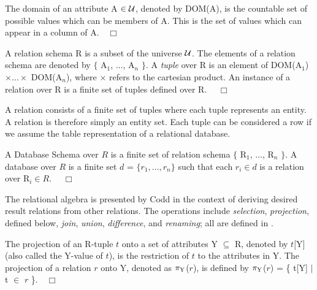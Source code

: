 \begin{definition}
\begin{rm}
The domain of an attribute A $\in \cal U$, denoted by DOM(A), is the
countable set
of possible values which can be members of A.  This is the set
of values which can appear in a column of A.$\quad\Box$
\end{rm}
\end{definition}
\begin{definition}
\begin{rm}
A relation schema R is a subset of the universe $\cal U$.  The elements
of a relation schema are denoted by $\{$ A$_1$, $\ldots$, A$_n$ $\}$.
A {\em tuple} over R is an element of DOM(A$_1$) $\times \ldots \times$
DOM(A$_n$), where $\times$ refers to the cartesian product.  An instance
of a relation over R is a finite set of tuples defined over R. $\quad\Box$
\end{rm}
\end{definition}

A relation consists of a finite set of tuples where each tuple
represents an entity.  A relation is therefore simply an entity set. 
Each tuple can be considered a row if we assume
the table representation of a relational database.
\begin{definition}
\begin{rm}
A Database Schema over $R$ is a finite set of relation schema $\{$ R$_1$,
$\ldots$, R$_n$ $\}$.  A database over $R$ is a finite set $d$ = $\{ r_1,
\ldots, r_n \}$ such that each $r_i \in d$ is a relation over R$_i \in
R$. $\quad\Box$
\end{rm}
\end{definition}

The relational algebra is presented by Codd \cite{cod70} in the context of
deriving desired result relations from other relations.  The operations include
{\em selection}, {\em projection}, defined below, {\em join}, {\em
union}, {\em difference}, and
{\em renaming};  all are defined in
\cite{databasefound,atze93,Date95,Maier83,Ullm88}.
\begin{definition}[Projection]
\begin{rm}
The projection of an R-tuple $t$ onto a set of attributes Y $\subseteq$
R, denoted by $t[$Y$]$ (also called the Y-value of $t$), is the
restriction of $t$ to the attributes in Y.  The projection of a
relation $r$ onto Y, denoted as $\pi_{\rm Y}$($r$),
is defined by $\pi_{\rm Y}$($r$) = \{ t[Y] $\mid$ t $\in$ $r$ \}.$\quad\Box$
\end{rm}
\end{definition}

